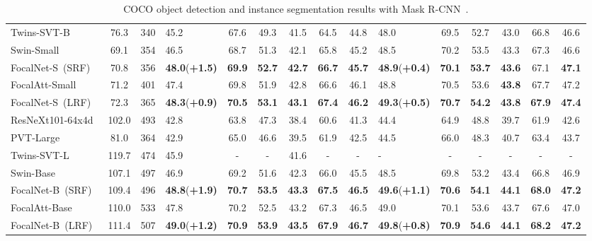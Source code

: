 \documentclass{article}
\begin{document}
\begin{table}[t]
{\begin{tabular}{lcc|lccccc|lccccc}
Twins-SVT-B~\cite{chu2021twins} & 76.3 & 340 & 45.2 & 67.6 & 49.3 & 41.5 & 64.5 & 44.8 & 48.0 & 69.5 & 52.7 & 43.0 & 66.8 & 46.6 \\
Swin-Small~\cite{liu2021swin} & 69.1 & 354 & 46.5 & 68.7 & 51.3 & 42.1 & 65.8 & 45.2 & 48.5 & 70.2 & 53.5 & 43.3 & 67.3 & 46.6 \\
\rowcolor{Gray}
FocalNet-S~(SRF) & 70.8 & 356 & \textbf{48.0}{\textcolor{green!50!black}{(\bf+1.5)}} & \textbf{69.9} & \textbf{52.7} & \textbf{42.7} & \textbf{66.7} & \textbf{45.7} &  \textbf{48.9}{\textcolor{green!50!black}{(\bf+0.4)}} & \textbf{70.1} & \textbf{53.7} & \textbf{43.6} & 67.1 & \textbf{47.1} \\
FocalAtt-Small~\cite{yang2021focal} & 71.2 & 401 &{47.4} & {69.8} & {51.9} & {42.8} & {66.6} & {46.1} & {48.8} & {70.5} & {53.6} & \textbf{43.8} & {67.7} & {47.2} \\
\rowcolor{Gray}
FocalNet-S~(LRF) & 72.3 & 365 & \textbf{48.3}{\textcolor{green!50!black}{(\bf+0.9)}} & \textbf{70.5} & \textbf{53.1} & \textbf{43.1} & \textbf{67.4} & \textbf{46.2} & \textbf{49.3}{\textcolor{green!50!black}{(\bf+0.5)}} & \textbf{70.7} & \textbf{54.2} & \textbf{43.8} & \textbf{67.9} & \textbf{47.4} \\
\midrule
ResNeXt101-64x4d~\cite{xie2017aggregated} & 102.0 & 493 & 42.8 & 63.8 & 47.3 & 38.4 & 60.6 & 41.3 & 44.4 & 64.9 & 48.8 & 39.7 & 61.9 & 42.6 \\
PVT-Large\cite{wang2021pyramid} & 81.0 & 364 & 42.9 & 65.0 & 46.6 & 39.5 & 61.9 & 42.5 & 44.5 & 66.0 & 48.3 & 40.7 & 63.4 & 43.7 \\
Twins-SVT-L~\cite{chu2021twins} & 119.7 & 474 & 45.9 & - & - & 41.6 & - & - & - & - & - & - & - & -   \\
Swin-Base~\cite{liu2021swin} & 107.1 & 497 & 46.9 & 69.2 & 51.6 & 42.3 & 66.0 & 45.5 & 48.5 & 69.8 & 53.2 & 43.4 & 66.8 & 46.9 \\
\rowcolor{Gray}
FocalNet-B~(SRF) & 109.4 & 496 &  \textbf{48.8}{\textcolor{green!50!black}{(\bf+1.9)}} & \textbf{70.7} & \textbf{53.5} & \textbf{43.3} & \textbf{67.5} & \textbf{46.5} & \textbf{49.6}{\textcolor{green!50!black}{(\bf+1.1)}} & \textbf{70.6} & \textbf{54.1} & \textbf{44.1} & \textbf{68.0} & \textbf{47.2} \\
FocalAtt-Base~\cite{yang2021focal} & 110.0 & 533 & {47.8} & {70.2} & {52.5} & {43.2} & {67.3} & {46.5} & {49.0} & {70.1} & {53.6} & {43.7} & {67.6} & {47.0} \\
\rowcolor{Gray}
FocalNet-B~(LRF) & 111.4 & 507  & \textbf{49.0}{\textcolor{green!50!black}{(\bf+1.2)}} & \textbf{70.9} & \textbf{53.9} & \textbf{43.5} & \textbf{67.9} & \textbf{46.7} & \textbf{49.8}{\textcolor{green!50!black}{(\bf+0.8)}} & \textbf{70.9} & \textbf{54.6} & \textbf{44.1} & \textbf{68.2} & \textbf{47.2}  \\
\bottomrule
\end{tabular}
}
\captionsetup{font=footnotesize}    
\caption{COCO object detection and instance segmentation results with Mask R-CNN~\cite{he2017mask}. 
}
\label{tab:maskrcnn}
\vspace{-6mm}
\end{table}
\end{document}
